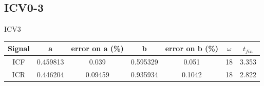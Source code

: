 \documentclass{report}
\begin{document}
\subsection{ICV0-3}
ICV3
\begin{tabular}{||c c c c c c c||}
 \hline
 Signal & a & error on a (\%) & b & error on b (\%) & $\omega$ & $t_{fin}$\\ [0.5ex]
 \hline\hline
 ICF & 0.459813&  0.039 & 0.595329 & 0.051 & 18 & 3.353\\
 ICR & 0.446204&  0.09459& 0.935934& 0.1042& 18 & 2.822\\
 \hline
\end{tabular}
\end{document}
